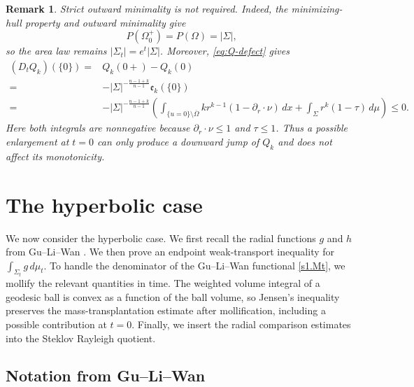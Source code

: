 \documentclass[10pt,a4paper]{amsart}
\numberwithin{equation}{section}
\newtheorem{remark}[theorem]{Remark}
\newcommand{\dd}{\,d}
\begin{document}
\begin{remark}\label{rem:Euclidean-endpoint}
Strict outward minimality is not required. Indeed, the minimizing-hull property and outward minimality give
\[
    P(\Omega_0^+)=P(\Omega)=|\Sigma|,
\]
so the area law remains $|\Sigma_t|=e^t|\Sigma|$. Moreover, \eqref{eq:Q-defect} gives
\begin{align*}
     (D_t Q_k)(\{0\})=&Q_k(0+)-Q_k(0)\\
     =&-|\Sigma|^{-\frac{n-1+k}{n-1}}\mathfrak e_k(\{0\}) \\
    =&-|\Sigma|^{-\frac{n-1+k}{n-1}} \left(
      \int_{\{u=0\}\setminus\overline\Omega}
        kr^{k-1}(1-\partial_r\cdot\nu)\,dx
      +\int_\Sigma r^k(1-\tau)\,d\mu
      \right) \leq 0.
\end{align*}
Here both integrals are nonnegative because $\partial_r\cdot\nu\leq1$ and $\tau\leq1$. Thus a possible enlargement at $t=0$ can only produce a downward jump of $Q_k$ and does not affect its monotonicity.
\end{remark}

\section{The hyperbolic case}\label{sec.4}

We now consider the hyperbolic case.  We first recall the radial functions $g$ and $h$ from Gu--Li--Wan \cite{GuLiWan2025}.  We then prove an endpoint weak-transport inequality for $\int_{\Sigma_t}g\dd\mu_t$.  To handle the denominator of the Gu--Li--Wan functional \eqref{s1.Mt}, we mollify the relevant quantities in time.  The weighted volume integral of a geodesic ball is convex as a function of the ball volume, so Jensen's inequality preserves the mass-transplantation estimate after mollification, including a possible contribution at $t=0$.  Finally, we insert the radial comparison estimates into the Steklov Rayleigh quotient.

\subsection{Notation from Gu--Li--Wan \cite{GuLiWan2025}}
\end{document}
